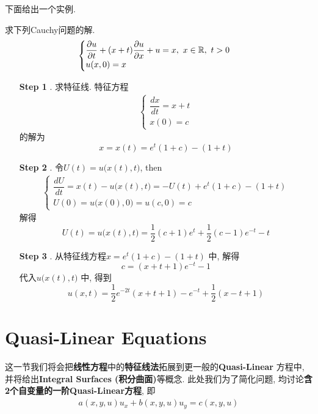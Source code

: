 	下面给出一个实例. 
	\begin{example}\label{ex 1.1.1}
		求下列Cauchy问题的解. 
		\begin{align*}
			\begin{cases}
				\dfrac{\partial u}{\partial t} + (x + t) \dfrac{\partial u}{\partial x} + u = x , \,\, x \in \mathbb{R} , \,\, t > 0 \\
				u(x , 0) = x
			\end{cases}
		\end{align*}
		
		\vspace*{2em}
		
		\begin{solution}
			\begin{enumerate}
				\item[\textbf{Step 1}]. 求特征线. 特征方程
				\begin{align*}
					\begin{cases}
						\dfrac{dx}{dt} = x + t \\
						x(0) = c
					\end{cases}
				\end{align*}
				的解为
				\[ x = x(t) = e^t (1 + c) - (1 + t) \]
				
				\vspace*{2em}
				
				\item[\textbf{Step 2}]. 令$U(t) = u\Big( x(t) , t \Big)$, then
				\begin{align*}
					\begin{cases}
						\dfrac{dU}{dt} = x(t) - u\Big( x(t) , t \Big) = -U(t) + e^t (1 + c) - (1 + t) \\
						U(0) = u\Big( x(0), 0 \Big) = u(c , 0) = c
					\end{cases}
				\end{align*}
				解得
				\[ U(t) = u \Big( x(t) , t \Big) = \frac{1}{2}(c + 1) e^t + \frac{1}{2}(c - 1) e^{-t} - t \]
				
				\item[\textbf{Step 3}]. 从特征线方程$x = e^t (1 + c) - (1 + t)$ 中, 解得
				\[ c = (x + t + 1)e^{-t} - 1 \]
				代入$u \Big( x(t) , t \Big)$ 中, 得到
				\[ u(x , t) = \frac{1}{2} e^{-2t} (x + t + 1) - e^{-t} + \frac{1}{2}(x - t + 1) \]
			\end{enumerate}
		\end{solution}
	\end{example}

\newpage

\section{Quasi-Linear Equations}
	这一节我们将会把\textbf{线性方程}中的\textbf{特征线法}拓展到更一般的\textbf{Quasi-Linear} 方程中, 并将给出\textbf{Integral Surfaces (积分曲面)}等概念. 此处我们为了简化问题, 均讨论\textbf{含2个自变量的一阶Quasi-Linear方程}, 即
	\begin{align}
		a(x , y , u) u_x + b(x , y , u)u_y = c(x , y , u) \label{1.5}
	\end{align}
	
